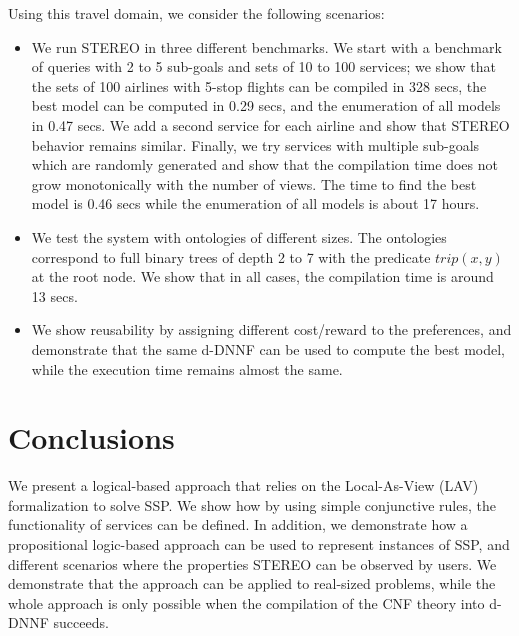 \documentclass{llncs}
\newcommand{\trip}{\textit{trip}}
\begin{document}
Using this travel domain, we  consider the following scenarios:
\begin{itemize}
\item We run STEREO in three different benchmarks.   We start with a benchmark of  queries with 2
to 5 sub-goals and sets of 10 to 100 services; we show that the sets of 100
airlines with 5-stop flights can be compiled in 328 secs, 
the best model can be computed in 0.29 secs, and the enumeration of all models in 0.47 secs. We add a second  service for each airline and show that STEREO behavior remains similar. Finally, we  try services with multiple sub-goals which are randomly generated and show that the compilation time  does not grow monotonically with the number of views.  The time to find the best model 
is 0.46 secs while the enumeration of all models is about 17 hours.
\item We test the system with ontologies of different sizes. The ontologies correspond to full binary trees of depth 2 to 7  with the predicate $\trip(x,y)$ at the root node. We show that in all cases, the compilation time  is  around 13 secs.
\item We show reusability by assigning different cost/reward to the  preferences,  
 and demonstrate that the same d-DNNF can be used to compute the best model, while the execution time remains almost the same. 
\end{itemize}

\section{Conclusions}
We present a logical-based approach that relies on the Local-As-View (LAV) formalization \cite{levy:bucket} to solve SSP. We show how by using simple conjunctive rules, the functionality of services  can be defined. In addition, we demonstrate how a propositional logic-based approach can be used to represent instances of SSP, and different scenarios where the properties STEREO can be observed by  users.  We demonstrate that the approach can be applied to
real-sized problems, while the whole approach is only possible
when the compilation of the CNF theory into d-DNNF  succeeds.


 
\end{document}
